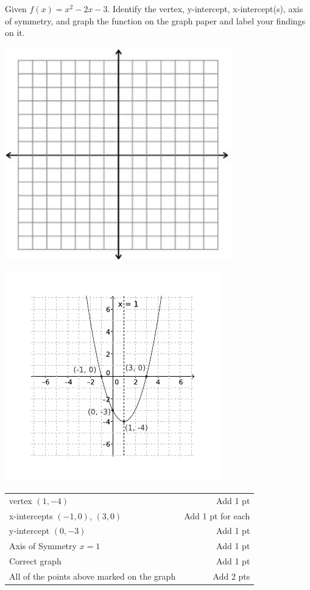 {
	Given $f(x)=x^2-2x-3$. Identify the vertex, y-intercept, x-intercept(s), axis of symmetry, and graph the function on the graph paper and label your findings on it.\begin{onlyproblem}\begin{center}\includegraphics{fig-graphpaper.png}\end{center}\end{onlyproblem} \begin{onlysolution}\begin{center}\includegraphics{fig100-18-c-answer}\end{center}\end{onlysolution}
}
{
	\begin{tabular}{l r}
	vertex $(1, -4)$ & Add 1 pt\\
	x-intercepts $(-1,0)$, $(3, 0)$ & Add 1 pt for each\\
	y-intercept $(0,-3)$ & Add 1 pt\\
	Axis of Symmetry  $x=1$ & Add 1 pt\\
	Correct graph & Add 1 pt\\
	All of the points above marked on the graph & Add 2 pts\\
	\end{tabular}
}

